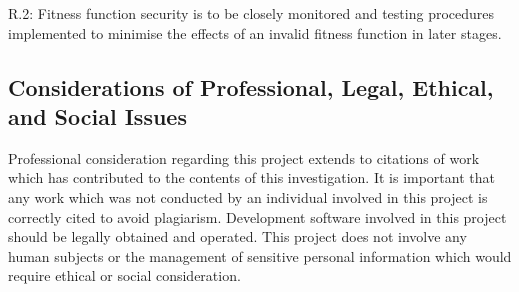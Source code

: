 \documentclass[11pt]{article}  %
\theoremstyle{definition}
\theoremstyle{remark}
\begin{document}
R.2:	Fitness function security is to be closely monitored and testing procedures implemented to minimise the effects of an invalid fitness function in later stages.

\subsection {Considerations of Professional, Legal, Ethical, and Social Issues}

Professional consideration regarding this project extends to citations of work which has contributed to the contents of this investigation. It is important that any work which was not conducted by an individual involved in this project is correctly cited to avoid plagiarism.
Development software involved in this project should be legally obtained and operated.
This project does not involve any human subjects or the management of sensitive personal information which would require ethical or social consideration.
\end{document}

